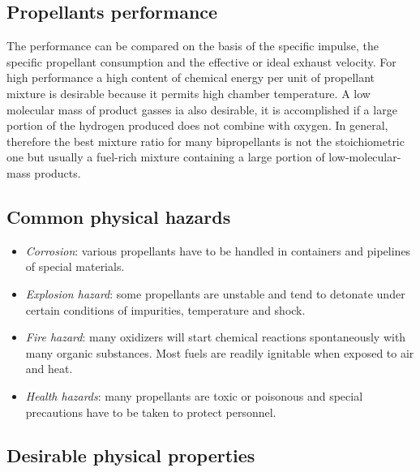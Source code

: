 \documentclass[12pt]{article}
\begin{document}
\subsection{Propellants performance}

The performance can be compared on the basis of the specific impulse, the specific propellant consumption and the effective or ideal exhaust velocity. For high performance a high content of chemical energy per unit of propellant mixture is desirable because it permits high chamber temperature. A low molecular mass of product gasses ia also desirable, it is accomplished if a large portion of the hydrogen produced does not combine with oxygen. In general, therefore the best mixture ratio for many bipropellants is not the stoichiometric one but usually a fuel-rich mixture containing a large portion of low-molecular-mass products.

\subsection{Common physical hazards}

\begin{itemize}
    \item \textit{Corrosion}: various propellants have to be handled in containers and pipelines of special materials.
    \item \textit{Explosion hazard}: some propellants are unstable and tend to detonate under certain conditions of impurities, temperature and shock.
    \item \textit{Fire hazard}: many oxidizers will start chemical reactions spontaneously with many organic substances. Most fuels are readily ignitable when exposed to air and heat.
    \item \textit{Health hazards}: many propellants are toxic or poisonous and special precautions have to be taken to protect personnel.
\end{itemize}

\subsection{Desirable physical properties}
\end{document}
